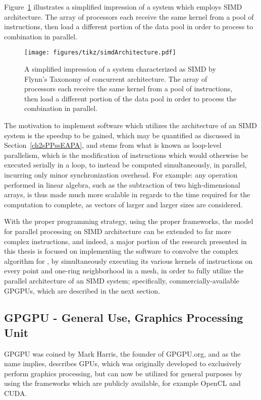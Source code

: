 Figure~\ref{fig:simdArchitecture} illustrates a simplified impression of a system which employs SIMD architecture. The array of processors each receive the same kernel from a pool of instructions, then load a different portion of the data pool in order to process to combination in parallel.

\begin{figure}[ht]
\ffigbox
	{\texttt{[image: figures/tikz/simdArchitecture.pdf]}}
	{\caption[SIMD Architecture]{A simplified impression of a system characterized as SIMD by Flynn's Taxonomy of concurrent architecture. The array of processors each receive the same kernel from a pool of instructions, then load a different portion of the data pool in order to process the combination in parallel.}\label{fig:simdArchitecture}}
\end{figure}

The motivation to implement software which utilizes the architecture of an \gls{SIMD} system is the speedup to be gained, which may be quantified as discussed in Section~\ref{ch2sPPssEAPA}, and stems from what is known as loop-level parallelism, which is the modification of instructions which would otherwise be executed serially in a loop, to instead be computed simultaneously, in parallel, incurring only minor synchronization overhead. For example: any operation performed in linear algebra, such as the subtraction of two high-dimensional arrays, is thus made much more scalable in regards to the time required for the computation to complete, as vectors of larger and larger sizes are considered.

With the proper programming strategy, using the proper frameworks, the model for parallel processing on \gls{SIMD} architecture can be extended to far more complex instructions, and indeed, a major portion of the research presented in this thesis is focused on implementing the software to convolve the complex algorithm for , by simultaneously executing its various kernels of instructions on every point and one-ring neighborhood in a mesh, in order to fully utilize the parallel architecture of an SIMD system; specifically, commercially-available \glspl{GPGPU}, which are described in the next section.

%
%
%
%
\subsection{GPGPU - General Use, Graphics Processing Unit}
\label{ch2sPPssGPGPU}
\gls{GPGPU} was coined by Mark Harris, the founder of GPGPU.org, and as the name implies, describes \glspl{GPU}, which was originally developed to exclusively perform graphics processing, but can now be utilized for general purposes by using the frameworks which are publicly available, for example OpenCL and CUDA.

